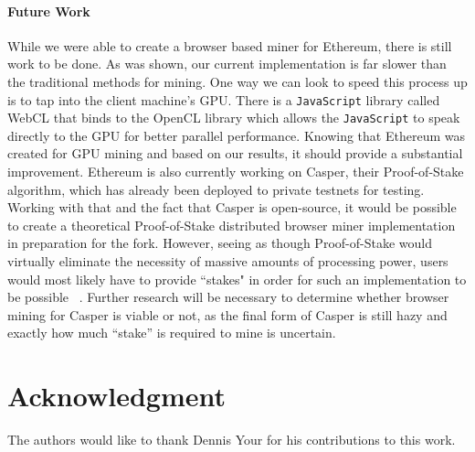 \documentclass[runningheads]{llncs}
\begin{document}
\paragraph{Future Work}
While we were able to create a browser based miner for Ethereum, there is still work to be done. As was shown, our current implementation is far slower than the traditional methods for mining. One way we can look to speed this process up is to tap into the client machine's GPU. There is a \verb|JavaScript| library called WebCL that binds to the OpenCL library which allows the \verb|JavaScript| to speak directly to the GPU for better parallel performance. Knowing that Ethereum was created for GPU mining and based on our results, it should provide a substantial improvement. 
Ethereum is also currently working on Casper, their Proof-of-Stake algorithm, which has already been deployed to private testnets for testing. Working with that and the fact that Casper is open-source, it would be possible to create a theoretical Proof-of-Stake distributed browser miner implementation in preparation for the fork. However, seeing as though Proof-of-Stake would virtually eliminate the necessity of massive amounts of processing power, users would most likely have to provide ``stakes" in order for such an implementation to be possible ~\cite{PoSproof}. Further research will be necessary to determine whether browser mining for Casper is viable or not, as the final form of Casper is still hazy and exactly how much ``stake'' is required to mine is uncertain.




\section*{Acknowledgment}
The authors would like to thank Dennis Your for his contributions to this work.
\end{document}
